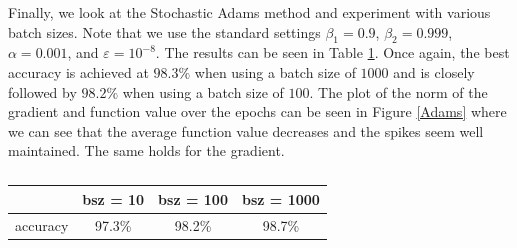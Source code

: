 \documentclass[12pt]{article}%
\def\eps{{\epsilon}}
\renewcommand{\epsilon}{\varepsilon}
\begin{document}
Finally, we look at the Stochastic Adams method and experiment with various batch sizes. Note that we use the standard settings $\beta_1 = 0.9$, $\beta_2 = 0.999$, $\alpha = 0.001$, and $\eps = 10^{-8}$. The results can be seen in Table \ref{adams-table}. Once again, the best accuracy is achieved at $98.3\%$ when using a batch size of $1000$ and is closely followed by $98.2\%$ when using a batch size of $100$. The plot of the norm of the gradient and function value over the epochs can be seen in Figure \ref{Adams} where we can see that the average function value decreases and the spikes seem well maintained. The same holds for the gradient. 

\begin{table}[h!]
    \centering
    \begin{tabular}{c|c|c|c}
        &  bsz = 10& bsz = 100 &  bsz = 1000  \\ \hline
        accuracy&  97.3\% &  98.2\%&  98.7\%  \\
    \end{tabular}
    \caption{}
    \label{adams-table}
\end{table}
\end{document}
